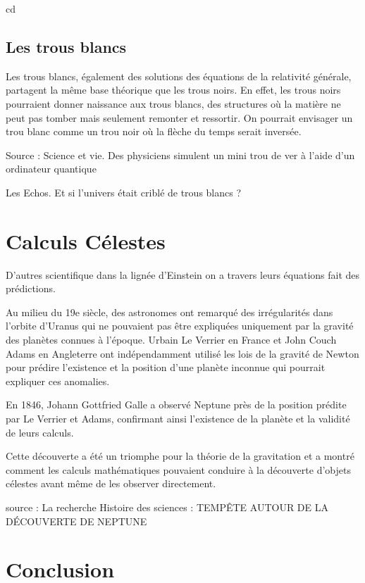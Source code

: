 cd\documentclass{article}
\begin{document}
\subsection{Les trous blancs}
Les trous blancs, également des solutions des équations de la relativité générale, partagent la même base théorique que les trous noirs. En effet, les trous noirs pourraient donner naissance aux trous blancs, des structures où la matière ne peut pas tomber mais seulement remonter et ressortir. On pourrait envisager un trou blanc comme un trou noir où la flèche du temps serait inversée.



Source : Science et vie. Des physiciens simulent un mini trou de ver à l’aide d’un ordinateur quantique

Les Echos. Et si l'univers était criblé de trous blancs ?

\label{sec:article4} 

\section{Calculs Célestes}

D'autres scientifique dans la lignée d'Einstein on a travers leurs équations fait des prédictions. 


Au milieu du 19e siècle, des astronomes ont remarqué des irrégularités dans l'orbite d'Uranus qui ne pouvaient pas être expliquées uniquement par la gravité des planètes connues à l'époque. Urbain Le Verrier en France et John Couch Adams en Angleterre ont indépendamment utilisé les lois de la gravité de Newton pour prédire l'existence et la position d'une planète inconnue qui pourrait expliquer ces anomalies.

En 1846, Johann Gottfried Galle a observé Neptune près de la position prédite par Le Verrier et Adams, confirmant ainsi l'existence de la planète et la validité de leurs calculs.

Cette découverte a été un triomphe pour la théorie de la gravitation et a montré comment les calculs mathématiques pouvaient conduire à la découverte d'objets célestes avant même de les observer directement.

source : La recherche Histoire des sciences : TEMPÊTE AUTOUR DE LA DÉCOUVERTE DE NEPTUNE







\section{Conclusion}
\end{document}

